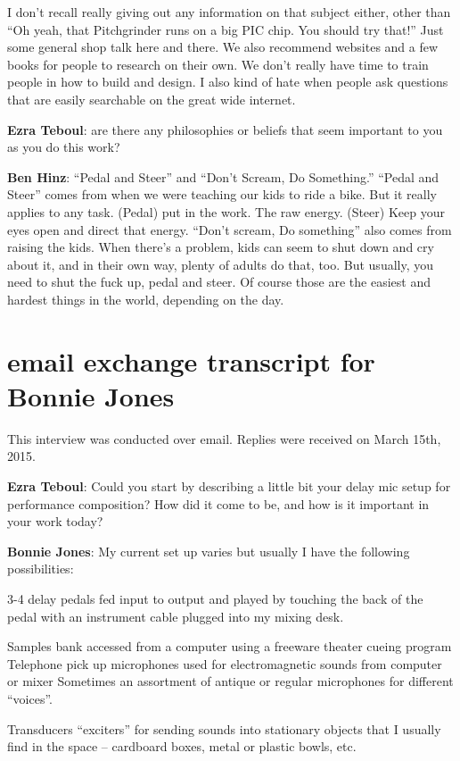 I don't recall really giving out any information on that subject either, other 
than ``Oh yeah, that Pitchgrinder runs on a big PIC chip. You should try that!'' Just 
some general shop talk here and there. We also recommend websites and a few 
books for people to research on their own. We don’t really have time to train 
people in how to build and design. I also kind of hate when people ask questions 
that are easily searchable on the great wide internet.

\textbf{Ezra Teboul}: are there any philosophies or beliefs that seem important to you as
you do this work?

\textbf{Ben Hinz}: ``Pedal and Steer'' and ``Don't Scream, Do Something.''
``Pedal and Steer'' comes from when we were teaching our kids to ride a
bike. But it really applies to any task. (Pedal) put in the work. The
raw energy. (Steer) Keep your eyes open and direct that energy.
``Don't scream, Do something'' also comes from raising the kids. When
there's a problem, kids can seem to shut down and cry about it, and in
their own way, plenty of adults do that, too. But usually, you need to
shut the fuck up, pedal and steer. Of course those are the easiest and
hardest things in the world, depending on the day.

\newpage

\clearpage 
\section{email exchange transcript for Bonnie Jones}

This interview was conducted over email. Replies were received on March 15th, 2015. 

\textbf{Ezra Teboul}: Could you start by describing a little bit your delay \/ mic setup for performance \/ composition? How did it come to be, and how is it important in your work today?

\textbf{Bonnie Jones}: My current set up varies but usually I have the following possibilities: 

3-4 delay pedals fed input to output and played by touching the back of the pedal with an instrument cable plugged into my mixing desk. 

Samples bank accessed from a computer using a freeware theater cueing program 
Telephone pick up microphones used for electromagnetic sounds from computer or mixer
Sometimes an assortment of antique or regular microphones for different ``voices''.
 
Transducers ``exciters'' for sending sounds into stationary objects that I usually find in the space – cardboard boxes, metal or plastic bowls, etc.
 
